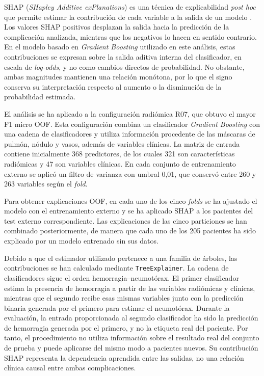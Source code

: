 SHAP (\textit{SHapley Additive exPlanations}) es una técnica de explicabilidad \textit{post hoc} que permite estimar la contribución de cada variable a la salida de un modelo \cite{Lundberg2017SHAP}. Los valores SHAP positivos desplazan la salida hacia la predicción de la complicación analizada, mientras que los negativos lo hacen en sentido contrario. En el modelo basado en \textit{Gradient Boosting} utilizado en este análisis, estas contribuciones se expresan sobre la salida aditiva interna del clasificador, en escala de \textit{log-odds}, y no como cambios directos de probabilidad. No obstante, ambas magnitudes mantienen una relación monótona, por lo que el signo conserva su interpretación respecto al aumento o la disminución de la probabilidad estimada.

El análisis se ha aplicado a la configuración radiómica R07, que obtuvo el mayor F1 micro OOF. Esta configuración combina un clasificador \textit{Gradient Boosting} con una cadena de clasificadores y utiliza información procedente de las máscaras de pulmón, nódulo y vasos, además de variables clínicas. La matriz de entrada contiene inicialmente 368 predictores, de los cuales 321 son características radiómicas y 47 son variables clínicas. En cada conjunto de entrenamiento externo se aplicó un filtro de varianza con umbral 0,01, que conservó entre 260 y 263 variables según el \textit{fold}.

Para obtener explicaciones OOF, en cada uno de los cinco \textit{folds} se ha ajustado el modelo con el entrenamiento externo y se ha aplicado SHAP a los pacientes del test externo correspondiente. Las explicaciones de las cinco particiones se han combinado posteriormente, de manera que cada uno de los 205 pacientes ha sido explicado por un modelo entrenado sin sus datos.

Debido a que el estimador utilizado pertenece a una familia de árboles, las contribuciones se han calculado mediante \texttt{TreeExplainer}. La cadena de clasificadores sigue el orden hemorragia--neumotórax. El primer clasificador estima la presencia de hemorragia a partir de las variables radiómicas y clínicas, mientras que el segundo recibe esas mismas variables junto con la predicción binaria generada por el primero para estimar el neumotórax. Durante la evaluación, la entrada proporcionada al segundo clasificador ha sido la predicción de hemorragia generada por el primero, y no la etiqueta real del paciente. Por tanto, el procedimiento no utiliza información sobre el resultado real del conjunto de prueba y puede aplicarse del mismo modo a pacientes nuevos. Su contribución SHAP representa la dependencia aprendida entre las salidas, no una relación clínica causal entre ambas complicaciones.

